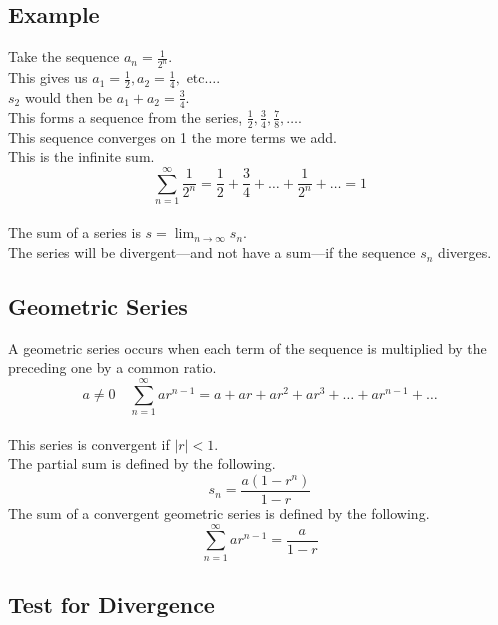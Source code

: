 \documentclass[12pt]{article}
\begin{document}
\subsection{Example}

Take the sequence $a_n = \frac{1}{2^n}$.\\
This gives us $a_1 = \frac{1}{2}, a_2 = \frac{1}{4},\text{ etc}\dots$.\\
$s_2$ would then be $a_1 + a_2 = \frac{3}{4}$.\\
This forms a sequence from the series, ${\frac{1}{2}, \frac{3}{4}, \frac{7}{8}, \dots}$.\\
This sequence converges on 1 the more terms we add.\\
This is the infinite sum.\\
\begin{displaymath}
\sum_{n=1}^{\infty} \frac{1}{2^n} = \frac{1}{2} + \frac{3}{4} + \dots + \frac{1}{2^n} + \dots = 1
\end{displaymath}
\\
The sum of a series is $s = \lim_{n\to\infty} s_n$.\\
The series will be divergent---and not have a sum---if the sequence ${s_n}$ diverges.


\subsection{Geometric Series}

A geometric series occurs when each term of the sequence is multiplied by the preceding one by a common ratio.\\
\begin{displaymath}
a \neq 0 \quad \sum_{n=1}^{\infty} ar^{n-1} = a + ar + ar^2 + ar^3 + \dots + ar^{n-1} + \dots
\end{displaymath}
\\
This series is convergent if $\left|r\right| < 1$.\\
The partial sum is defined by the following.\\
\begin{displaymath}
s_n = \frac{a(1 - r^n)}{1 - r}
\end{displaymath}
The sum of a convergent geometric series is defined by the following.\\
\begin{displaymath}
\sum_{n=1}^{\infty} ar^{n-1} = \frac{a}{1-r}
\end{displaymath}


\subsection{Test for Divergence}
\end{document}
